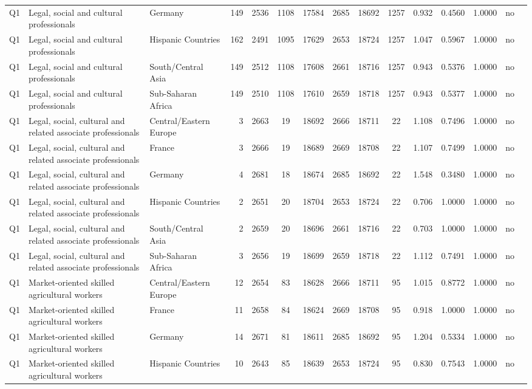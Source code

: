 \begin{longtable}{lllrcccccccccll}
Q1 & Legal, social and cultural professionals & Germany & 149 & 2536 & 1108 & 17584 & 2685 & 18692 & 1257 & 0.932 & 0.4560 & 1.0000 & no \\
Q1 & Legal, social and cultural professionals & Hispanic Countries & 162 & 2491 & 1095 & 17629 & 2653 & 18724 & 1257 & 1.047 & 0.5967 & 1.0000 & no \\
Q1 & Legal, social and cultural professionals & South/Central Asia & 149 & 2512 & 1108 & 17608 & 2661 & 18716 & 1257 & 0.943 & 0.5376 & 1.0000 & no \\
Q1 & Legal, social and cultural professionals & Sub-Saharan Africa & 149 & 2510 & 1108 & 17610 & 2659 & 18718 & 1257 & 0.943 & 0.5377 & 1.0000 & no \\
Q1 & Legal, social, cultural and related associate professionals & Central/Eastern Europe & 3 & 2663 & 19 & 18692 & 2666 & 18711 & 22 & 1.108 & 0.7496 & 1.0000 & no \\
Q1 & Legal, social, cultural and related associate professionals & France & 3 & 2666 & 19 & 18689 & 2669 & 18708 & 22 & 1.107 & 0.7499 & 1.0000 & no \\
Q1 & Legal, social, cultural and related associate professionals & Germany & 4 & 2681 & 18 & 18674 & 2685 & 18692 & 22 & 1.548 & 0.3480 & 1.0000 & no \\
Q1 & Legal, social, cultural and related associate professionals & Hispanic Countries & 2 & 2651 & 20 & 18704 & 2653 & 18724 & 22 & 0.706 & 1.0000 & 1.0000 & no \\
Q1 & Legal, social, cultural and related associate professionals & South/Central Asia & 2 & 2659 & 20 & 18696 & 2661 & 18716 & 22 & 0.703 & 1.0000 & 1.0000 & no \\
Q1 & Legal, social, cultural and related associate professionals & Sub-Saharan Africa & 3 & 2656 & 19 & 18699 & 2659 & 18718 & 22 & 1.112 & 0.7491 & 1.0000 & no \\
Q1 & Market-oriented skilled agricultural workers & Central/Eastern Europe & 12 & 2654 & 83 & 18628 & 2666 & 18711 & 95 & 1.015 & 0.8772 & 1.0000 & no \\
Q1 & Market-oriented skilled agricultural workers & France & 11 & 2658 & 84 & 18624 & 2669 & 18708 & 95 & 0.918 & 1.0000 & 1.0000 & no \\
Q1 & Market-oriented skilled agricultural workers & Germany & 14 & 2671 & 81 & 18611 & 2685 & 18692 & 95 & 1.204 & 0.5334 & 1.0000 & no \\
Q1 & Market-oriented skilled agricultural workers & Hispanic Countries & 10 & 2643 & 85 & 18639 & 2653 & 18724 & 95 & 0.830 & 0.7543 & 1.0000 & no \\

\end{longtable}
